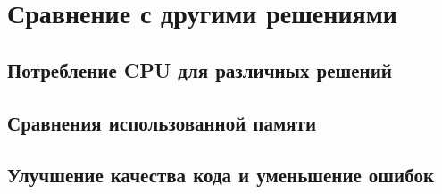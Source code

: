 
\chapter{Сравнение с другими решениями}
\section{Потребление CPU для различных решений}
\section{Сравнения использованной памяти}
\section{Улучшение качества кода и уменьшение ошибок}
\chapterconclusion
